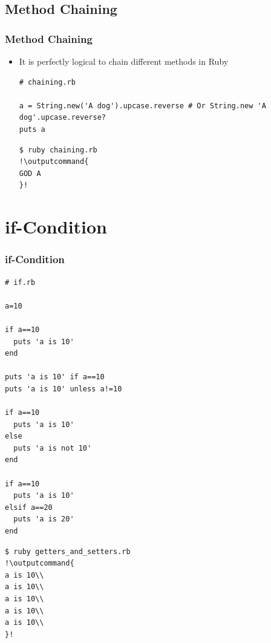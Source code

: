 \documentclass{beamer}
\newcommand{\outputcommand}[1]{\color{darkgreen}{#1}}
\begin{document}
\subsection{Method Chaining}
\begin{frame}[fragile]
\frametitle{Method Chaining}
\begin{itemize}
 \item It is perfectly logical to chain different methods in Ruby

\lstset{language=Ruby, style=eclipse}
\begin{lstlisting}[escapechar=&]
# chaining.rb

a = String.new('A dog').upcase.reverse # Or String.new 'A dog'.upcase.reverse?
puts a
\end{lstlisting}

\lstset{language=shell}
\begin{lstlisting}[numbers=none, escapechar=!]
$ ruby chaining.rb
!\outputcommand{
GOD A
}!
\end{lstlisting}
\end{itemize}

\end{frame}
\section{if-Condition}
\begin{frame}
\frametitle{if-Condition}
\lstset{language=Ruby, style=eclipse}
\begin{lstlisting}[escapechar=&]
# if.rb

a=10

if a==10
  puts 'a is 10'
end

puts 'a is 10' if a==10
puts 'a is 10' unless a!=10

if a==10
  puts 'a is 10'
else
  puts 'a is not 10'
end

if a==10
  puts 'a is 10'
elsif a==20
  puts 'a is 20'
end
\end{lstlisting}

\lstset{language=shell}
\begin{lstlisting}[numbers=none, escapechar=!]
$ ruby getters_and_setters.rb
!\outputcommand{
a is 10\\
a is 10\\
a is 10\\
a is 10\\
a is 10\\
}!
\end{lstlisting}
\end{frame}
\end{document}
